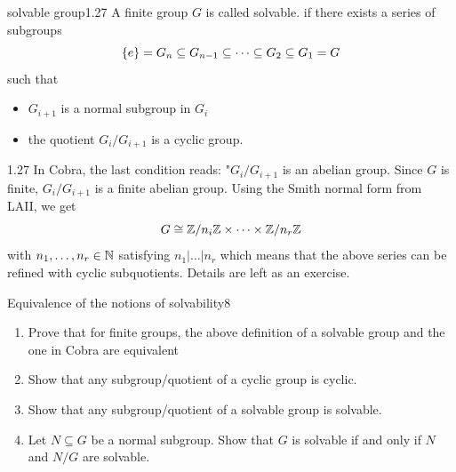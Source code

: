 \documentclass[twoside = false,	%
		headsepline,		%
		parskip = true,
		]{scrbook}						%
\begin{document}
        \begin{definition}{solvable group}{1.27}
            A finite group $G$ is called solvable. if there exists a series of subgroups
            $$\left\{ e\right\} = G_n\subseteq G_{n-1}\subseteq \dots \subseteq G_2\subseteq G_1= G$$
            such that \begin{itemize}
                \item $G_{i+1}$ is a normal subgroup in $G_i$
                \item the quotient $G_i/G_{i+1}$ is a cyclic group.
            \end{itemize}
        \end{definition}
        \begin{remark}{}{1.27}
            In Cobra, the last condition reads: "$G_i/G_{i+1}$ is an abelian group. Since $G$ is finite, $G_i/G_{i+1}$ is a finite abelian group. Using the Smith normal form from LAII, we get
            $$G\cong \mathbb Z/n_i\mathbb Z \times \dots \times \mathbb Z/n_r\mathbb Z$$ with $n_1,\dots, n_r\in\mathbb N$ satisfying $n_1|\dots|n_r$ which means that the above series can be refined with cyclic subquotients. Details are left as an exercise.
        \end{remark}
        \begin{exercise}{Equivalence of the notions of solvability}{8}
            \begin{enumerate}
                \item Prove that for finite groups, the above definition of a solvable group and the one in Cobra are equivalent
                \item Show that any subgroup/quotient of a cyclic group is cyclic.
                \item Show that any subgroup/quotient of a solvable group is solvable.
                \item Let $N\subseteq G$ be a normal subgroup. Show that $G$ is solvable if and only if $N$ and $N/G$ are solvable.
            \end{enumerate}
        \end{exercise}

%             
        
\end{document}
